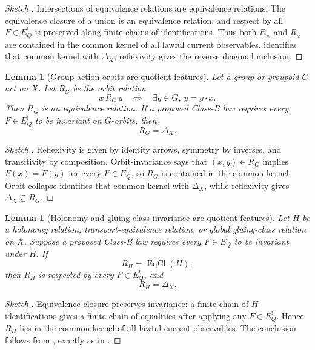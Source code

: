 \documentclass[11pt]{article}
\newcommand{\EQbang}{E^{!}_{Q}}
\newtheorem{lemma}[theorem]{Lemma}
\theoremstyle{definition}
\begin{document}
\begin{proof}[Sketch.]
Intersections of equivalence relations are equivalence relations.
The equivalence closure of a union is an equivalence relation, and
respect by all \(F\in\EQbang\) is preserved along finite chains of
identifications.  Thus both \(R_{\times}\) and \(R_{\vee}\) are
contained in the common kernel of all lawful current observables.
 identifies that common kernel with
\(\Delta_X\); reflexivity gives the reverse diagonal inclusion.
\end{proof}

\begin{lemma}[Group-action orbits are quotient features]
\label{lem:pvnp:orbit-quotient}
Let a group or groupoid \(G\) act on \(X\).  Let \(R_G\) be the orbit
relation
\[
  x\,R_G\,y
  \quad\Longleftrightarrow\quad
  \exists g\in G,\ y=g\cdot x .
\]
Then \(R_G\) is an equivalence relation.  If a proposed Class-B law
requires every \(F\in\EQbang\) to be invariant on \(G\)-orbits, then
\[
  R_G=\Delta_X .
\]
\end{lemma}

\begin{proof}[Sketch.]
Reflexivity is given by identity arrows, symmetry by inverses, and
transitivity by composition.  Orbit-invariance says that
\((x,y)\in R_G\) implies \(F(x)=F(y)\) for every \(F\in\EQbang\), so
\(R_G\) is contained in the common kernel.  Orbit collapse identifies
that common kernel with \(\Delta_X\), while reflexivity gives
\(\Delta_X\subseteq R_G\).
\end{proof}

\begin{lemma}[Holonomy and gluing-class invariance are quotient features]
\label{lem:pvnp:holonomy-quotient}
Let \(H\) be a holonomy relation, transport-equivalence relation, or
global gluing-class relation on \(X\).  Suppose a proposed Class-B law
requires every \(F\in\EQbang\) to be invariant under \(H\).  If
\[
  R_H=\operatorname{EqCl}(H),
\]
then \(R_H\) is respected by every \(F\in\EQbang\), and
\[
  R_H=\Delta_X .
\]
\end{lemma}

\begin{proof}[Sketch.]
Equivalence closure preserves invariance: a finite chain of
\(H\)-identifications gives a finite chain of equalities after applying
any \(F\in\EQbang\).  Hence \(R_H\) lies in the common kernel of all
lawful current observables.  The conclusion follows from
, exactly as in
.
\end{proof}
\end{document}
